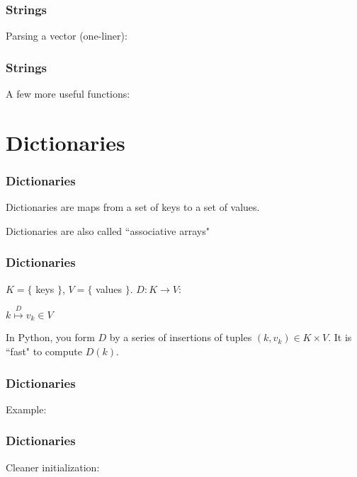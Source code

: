 \documentclass{beamer}
\begin{document}
\begin{frame}
\frametitle{Strings}
Parsing a vector (one-liner):
\end{frame}

\begin{frame}
\frametitle{Strings}
A few more useful functions:
\end{frame}


\section{Dictionaries}

\begin{frame}
\frametitle{Dictionaries}

Dictionaries are maps from a set of keys to a set of values.

\vspace{0.2in}

Dictionaries are also called ``associative arrays"
\end{frame}


\begin{frame}
\frametitle{Dictionaries}

$K = \{$ keys $\}$, $V = \{$ values $\}$.  $D: K \rightarrow V$:

\huge{
\begin{center}
$k \stackrel{D}{\longmapsto} v_k \in V$
\end{center}
} \normalsize{}

\vspace{0.2in}

In Python, you form $D$ by a series of insertions of tuples $(k, v_k) \in K \times V$.  It is ``fast" to compute $D(k)$.

\end{frame}

\begin{frame}
\frametitle{Dictionaries}

Example:


\end{frame}


\begin{frame}
\frametitle{Dictionaries}

Cleaner initialization:


\end{frame}
\end{document}
